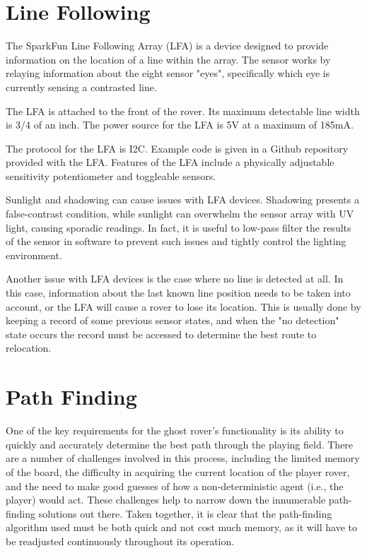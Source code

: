 \documentclass[12pt,letterpaper]{article}
\begin{document}
\section{Line Following}
The SparkFun Line Following Array (LFA) is a device designed to provide information on the location of a line within the array. The sensor works by relaying information about the eight sensor "eyes", specifically which eye is currently sensing a contrasted line. 

The LFA is attached to the front of the rover. Its maximum detectable line width is 3/4 of an inch. The power source for the LFA is 5V at a maximum of 185mA. 

The protocol for the LFA is I2C. Example code is given in a Github repository provided with the LFA. Features of the LFA include a physically adjustable sensitivity potentiometer and toggleable sensors. 

Sunlight and shadowing can cause issues with LFA devices. Shadowing presents a false-contrast condition, while sunlight can overwhelm the sensor array with UV light, causing sporadic readings. In fact, it is useful to low-pass filter the results of the sensor in software to prevent such issues and tightly control the lighting environment.

Another issue with LFA devices is the case where no line is detected at all. In this case, information about the last known line position needs to be taken into account, or the LFA will cause a rover to lose its location. This is usually done by keeping a record of some previous sensor states, and when the "no detection" state occurs the record must be accessed to determine the best route to relocation.

\section{Path Finding}
	One of the key requirements for the ghost rover's functionality is its ability to quickly and accurately determine the best path through the playing field. There are a number of challenges involved in this process, including the limited memory of the board, the difficulty in acquiring the current location of the player rover, and the need to make good guesses of how a non-deterministic agent (i.e., the player) would act. These challenges help to narrow down the innumerable path-finding solutions out there. Taken together, it is clear that the path-finding algorithm used must be both quick and not cost much memory, as it will have to be readjusted continuously throughout its operation.
	
\end{document}
